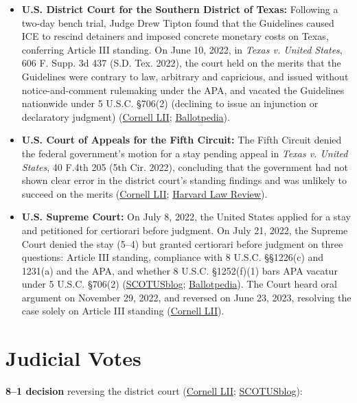 \documentclass[12pt]{article}
\begin{document}
\begin{itemize}
\item \textbf{U.S. District Court for the Southern District of Texas:} Following a two-day bench trial, Judge Drew Tipton found that the Guidelines caused ICE to rescind detainers and imposed concrete monetary costs on Texas, conferring Article III standing. On June 10, 2022, in \textit{Texas v. United States}, 606 F. Supp. 3d 437 (S.D. Tex. 2022), the court held on the merits that the Guidelines were contrary to law, arbitrary and capricious, and issued without notice-and-comment rulemaking under the APA, and vacated the Guidelines nationwide under 5 U.S.C. \S 706(2) (declining to issue an injunction or declaratory judgment) (\href{https://www.law.cornell.edu/supremecourt/text/22-58}{Cornell LII}; \href{https://ballotpedia.org/United_States_v._Texas_(2023)}{Ballotpedia}).
\item \textbf{U.S. Court of Appeals for the Fifth Circuit:} The Fifth Circuit denied the federal government's motion for a stay pending appeal in \textit{Texas v. United States}, 40 F.4th 205 (5th Cir. 2022), concluding that the government had not shown clear error in the district court's standing findings and was unlikely to succeed on the merits (\href{https://www.law.cornell.edu/supremecourt/text/22-58}{Cornell LII}; \href{https://harvardlawreview.org/print/vol-137/united-states-v-texas/}{Harvard Law Review}).
\item \textbf{U.S. Supreme Court:} On July 8, 2022, the United States applied for a stay and petitioned for certiorari before judgment. On July 21, 2022, the Supreme Court denied the stay (5--4) but granted certiorari before judgment on three questions: Article III standing, compliance with 8 U.S.C. \S\S 1226(c) and 1231(a) and the APA, and whether 8 U.S.C. \S 1252(f)(1) bars APA vacatur under 5 U.S.C. \S 706(2) (\href{https://www.scotusblog.com/cases/united-states-v-texas-5/}{SCOTUSblog}; \href{https://ballotpedia.org/United_States_v._Texas_(2023)}{Ballotpedia}). The Court heard oral argument on November 29, 2022, and reversed on June 23, 2023, resolving the case solely on Article III standing (\href{https://www.law.cornell.edu/supremecourt/text/22-58}{Cornell LII}).
\end{itemize}

\section{Judicial Votes}

\textbf{8--1 decision} reversing the district court (\href{https://www.law.cornell.edu/supremecourt/text/22-58}{Cornell LII}; \href{https://www.scotusblog.com/cases/united-states-v-texas-5/}{SCOTUSblog}):
\end{document}
